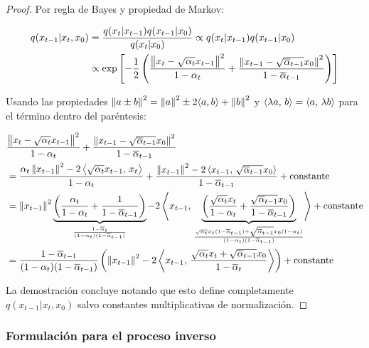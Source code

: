 \begin{proof}
    Por regla de Bayes y propiedad de Markov:

    \begin{align*}
        q(x_{t-1}|x_t,x_0) & = \frac{q(x_t|x_{t-1})q(x_{t-1}|x_0)}{q(x_t|x_0)}\propto q(x_t|x_{t-1})q(x_{t-1}|x_0)\\
                           & \propto \exp\left[-\frac{1}{2}\left(\frac{\left\lVert x_t-\sqrt{\alpha_t}x_{t-1} \right\rVert^2}{1-\alpha_t} + \frac{\left\lVert x_{t-1}-\sqrt{\overline{\alpha}_{t-1}}x_0 \right\rVert^2}{1-\overline{\alpha}_{t-1}}\right)\right]
    \end{align*}

    Usando las propiedades $\left\lVert a\pm b \right\rVert^2=\left\lVert a \right\rVert^2\pm 2\langle a,b\rangle + \left\lVert b \right\rVert^2$ y $\left\langle \lambda a,\,b\right\rangle = \left\langle a,\,\lambda b\right\rangle$ para el término dentro del paréntesis:

    \begin{align*}
         & \frac{\left\lVert x_t-\sqrt{\alpha_t}x_{t-1} \right\rVert^2}{1-\alpha_t} + \frac{\left\lVert x_{t-1}-\sqrt{\overline{\alpha}_{t-1}}x_0 \right\rVert^2}{1-\overline{\alpha}_{t-1}}\\
         & = \frac{\alpha_t\left\lVert x_{t-1} \right\rVert^2-2\left\langle \sqrt{\alpha_t}x_{t-1},\,x_t\right\rangle}{1-\alpha_t} + \frac{\left\lVert x_{t-1} \right\rVert^2-2\left\langle x_{t-1},\,\sqrt{\overline{\alpha}_{t-1}} x_0\right\rangle}{1-\overline{\alpha}_{t-1}}+\operatorname{constante}\\
         & =\left\lVert x_{t-1} \right\rVert^2\underbrace{\left(\frac{\alpha_t}{1-\alpha_t}+\frac{1}{1-\overline{\alpha}_{t-1}}\right)}_{\frac{1-\overline{\alpha}_t}{(1-\alpha_t)(1-\overline{\alpha}_{t-1})}}-2\left\langle x_{t-1},\,\underbrace{\left(\frac{\sqrt{\alpha_t}x_t}{1-\alpha_t} + \frac{\sqrt{\overline{\alpha}_{t-1}}x_0}{1-\overline{\alpha}_{t-1}}\right)}_{\frac{\sqrt{\alpha_t}x_t(1-\overline{\alpha}_{t-1})+\sqrt{\overline{\alpha}_{t-1}}x_0(1-\alpha_t)}{(1-\alpha_t)(1-\overline{\alpha}_{t-1})}}\right\rangle + \operatorname{constante}\\
         & =\frac{1-\overline{\alpha}_{t-1}}{(1-\alpha_t)(1-\overline{\alpha}_{t-1})}\left(\left\lVert x_{t-1} \right\rVert^2-2\left\langle x_{t-1},\,\frac{\sqrt{\alpha_t}x_t + \sqrt{\overline{\alpha}_{t-1}}x_0}{1-\overline{\alpha}_t}\right\rangle\right) + \operatorname{constante}\\
    \end{align*}

    La demostración concluye notando que esto define completamente $q(x_{t-1}|x_t,x_0)$ salvo constantes multiplicativas de normalización.
\end{proof}

\subsubsection{Formulación para el proceso inverso}

